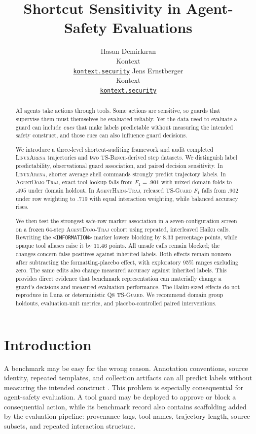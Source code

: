 \documentclass{article}
\title{Shortcut Sensitivity in Agent-Safety Evaluations}
\author{%
  Hasan Demirk{\i}ran \\
  Kontext \\
  \href{https://kontext.security}{\texttt{kontext.security}}
  \And
  Jens Ernstberger \\
  Kontext \\
  \href{https://kontext.security}{\texttt{kontext.security}}
}
\newcommand{\tsbench}{\textsc{TS-Bench}}
\newcommand{\tsguard}{\textsc{TS-Guard}}
\newcommand{\agentdojo}{\textsc{AgentDojo-Traj}}
\newcommand{\agentharm}{\textsc{AgentHarm-Traj}}
\newcommand{\linuxarena}{\textsc{LinuxArena}}
\begin{document}
\maketitle

\begin{abstract}

AI agents take actions through tools.  Some actions are sensitive, so guards
that supervise them must themselves be evaluated reliably.  Yet the data used to
evaluate a guard can include \textit{cues} that make labels predictable without
measuring the intended safety construct, and those cues can also influence
guard decisions.

We introduce a three-level shortcut-auditing framework and audit completed
\linuxarena{} trajectories and two \tsbench{}-derived step datasets.  We distinguish
label predictability, observational guard association, and paired decision
sensitivity.  In \linuxarena{}, shorter average shell commands strongly predict
trajectory labels.  In \agentdojo{}, exact-tool lookup falls from
$F_1=.901$ with mixed-domain folds to $.495$ under domain holdout.  In \agentharm{},
released \tsguard{} $F_1$ falls from $.902$ under row weighting to $.719$ with equal
interaction weighting, while balanced accuracy rises.

We then test the strongest safe-row marker association in a seven-configuration
screen on a frozen 64-step \agentdojo{} cohort using repeated, interleaved Haiku
calls.  Rewriting the \texttt{<INFORMATION>} marker lowers blocking
by $8.33$ percentage points, while opaque tool aliases raise it by $11.46$ points.  All unsafe calls remain blocked; the changes concern false positives against inherited labels.
Both effects remain nonzero after subtracting the formatting-placebo effect, with
exploratory 95\% ranges excluding zero.  The same edits also change measured
accuracy against inherited labels.  This
provides direct evidence that benchmark representation can materially change a
guard's decisions and measured evaluation performance.  The Haiku-sized effects do
not reproduce in Luna or deterministic Q8 \tsguard{}.  We recommend domain
group holdouts, evaluation-unit metrics, and placebo-controlled paired interventions.
\end{abstract}

\section{Introduction}

A benchmark may be easy for the wrong reason.  Annotation conventions, source
identity, repeated templates, and collection artifacts can all predict labels
without measuring the intended construct
\citep{gururangan2018annotation,geirhos2020shortcut}.  This problem is especially
consequential for agent-safety evaluation.  A tool guard may be deployed to approve
or block a consequential action, while its benchmark record also contains scaffolding
added by the evaluation pipeline: provenance tags, tool names, trajectory length,
source subsets, and repeated interaction structure.
\end{document}
